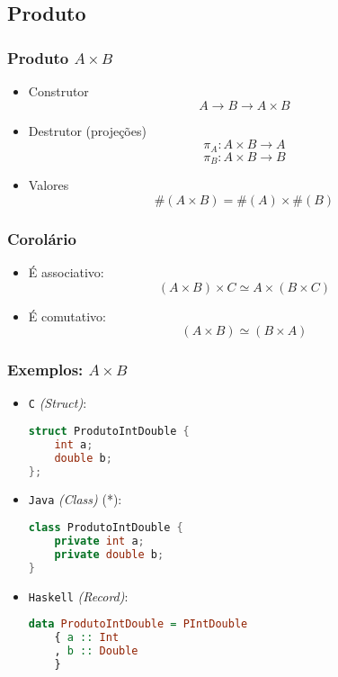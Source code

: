 \documentclass{beamer}
\newcommand{\lang}[1]{\texttt{#1}}
\newcommand{\typetam}{\#}
\newcommand{\typesim}{\simeq}
\begin{document}
\subsection{Produto}
\begin{frame}
    \frametitle{Produto \(A \times B\)}
    \begin{itemize}
        \item Construtor
            \[
                A \to B \to A \times B
            \]
            \vfill
        \item Destrutor (projeções)
            \[
                \pi_A : A \times B \to A
            \] \[
                \pi_B : A \times B \to B
            \]
            \vfill
        \item Valores
            \[
                \typetam(A \times B) = \typetam(A) \times \typetam(B)
            \]
    \end{itemize}
\end{frame}

\begin{frame}
    \frametitle{Corolário}
    \begin{itemize}
        \item É associativo:
            \[
                (A \times B) \times C \typesim A \times (B \times C)
            \]
            \vfill
        \item É comutativo:
            \[
                (A \times B) \typesim (B \times A)
            \]
    \end{itemize}
\end{frame}

\begin{frame}[fragile]
    \frametitle{Exemplos: \(A \times B\)}
    \begin{itemize}
        \item \lang{C} \emph{(Struct)}:
            \begin{lstlisting}[language=C]
struct ProdutoIntDouble {
    int a;
    double b;
};
            \end{lstlisting}
        \item \lang{Java} \emph{(Class)} (*):
            \begin{lstlisting}[language=Java]
class ProdutoIntDouble {
    private int a;
    private double b;
}
            \end{lstlisting}
        \item \lang{Haskell} \emph{(Record)}:
            \begin{lstlisting}[language=Haskell]
data ProdutoIntDouble = PIntDouble
    { a :: Int
    , b :: Double
    }
            \end{lstlisting}
    \end{itemize}
\end{frame}
\end{document}
